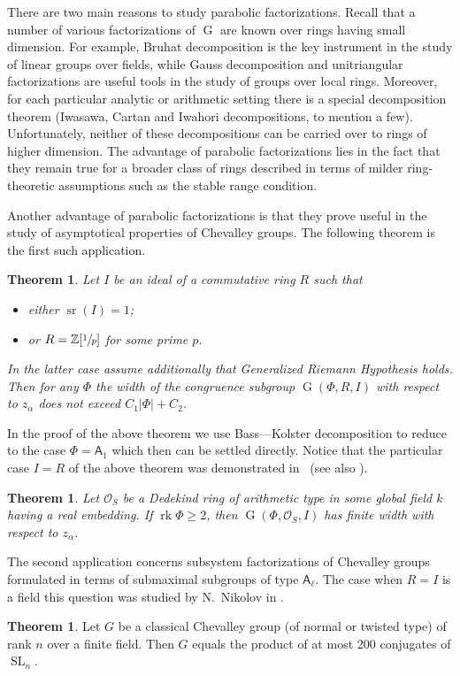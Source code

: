 \documentclass[12pt]{amsart}
\numberwithin{equation}{section}
\newcounter{thmcounter} \newcounter{lemmacounter}
\newtheorem{thm}[thmcounter]{Theorem}
\theoremstyle{definition}
\newtheorem*{thm*}{Theorem}
\DeclareMathOperator{\G}{G}
\DeclareMathOperator{\SL}{SL}
\DeclareMathOperator{\sr}{sr}
\DeclareMathOperator{\rk}{rk}
\newcommand{\rA}{\mathsf{A}}
\begin{document}
There are two main reasons to study parabolic factorizations.
Recall that a number of various factorizations of $\G$ are known over rings having small dimension.
For example, Bruhat decomposition is the key instrument in the study of linear groups over fields, 
 while Gauss decomposition and unitriangular factorizations are useful tools in the study of groups over local rings.
Moreover, for each particular analytic or arithmetic setting there is a special decomposition theorem (Iwasawa, Cartan and Iwahori decompositions, to mention a few).
Unfortunately, neither of these decompositions can be carried over to rings of higher dimension.
The advantage of parabolic factorizations lies in the fact that they remain true for a broader class of rings described in terms of milder ring-theoretic assumptions such as the stable range condition.

Another advantage of parabolic factorizations is that they prove useful in the study of asymptotical properties of Chevalley groups.
The following theorem is the first such application. 
\begin{thm} Let $I$ be an ideal of a commutative ring $R$ such that
\begin{itemize} \item either $\sr(I) = 1$;
 \item or $R = \mathbb{Z}[\sfrac{1}{p}]$ for some prime $p$. \end{itemize}
In the latter case assume additionally that Generalized Riemann Hypothesis holds.
Then for any $\Phi$ the width of the congruence subgroup $\G(\Phi, R, I)$ with respect to $z_\alpha$ does not exceed $C_1|\Phi| + C_2$. \end{thm}
\noindent In the proof of the above theorem we use Bass---Kolster decomposition to reduce to the case $\Phi=\rA_1$ which then can be settled directly.
Notice that the particular case $I=R$ of the above theorem was demonstrated in~\cite{VavSmSuUnitrEng} (see also \cite{VseUnitrZ1p}).

\begin{thm}
Let $\mathcal{O}_S$ be a Dedekind ring of arithmetic type in some global field $k$ having a real embedding. If $\rk\Phi\geqslant2$, then $\G(\Phi,\mathcal{O}_S,I)$ has finite width with respect to $z_\alpha$.
\end{thm}

The second application concerns subsystem factorizations of Chevalley groups formulated in terms of submaximal subgroups of type $\rA_\ell$.
The case when $R=I$ is a field this question was studied by N.~Nikolov in \cite{NikProdDecomp}. 
\begin{thm*} Let $G$ be a classical Chevalley group (of normal or twisted type) of rank $n$ over a finite field.
Then $G$ equals the product of at most $200$ conjugates of $\SL_n$. \end{thm*}
\end{document}
